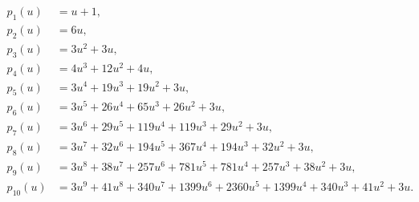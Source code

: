 \[
\begin{aligned}
p_1(u)&=u + 1,\\
p_2(u)&=6 u,\\
p_3(u)&=3 u^{2} + 3 u,\\
p_4(u)&=4 u^{3} + 12 u^{2} + 4 u,\\
p_5(u)&=3 u^{4} + 19 u^{3} + 19 u^{2} + 3 u,\\
p_6(u)&=3 u^{5} + 26 u^{4} + 65 u^{3} + 26 u^{2} + 3 u,\\
p_7(u)&=3 u^{6} + 29 u^{5} + 119 u^{4} + 119 u^{3} + 29 u^{2} + 3 u,\\
p_8(u)&=3 u^{7} + 32 u^{6} + 194 u^{5} + 367 u^{4} + 194 u^{3} + 32 u^{2} + 3 u,\\
p_9(u)&=3 u^{8} + 38 u^{7} + 257 u^{6} + 781 u^{5} + 781 u^{4} + 257 u^{3} + 38 u^{2} + 3 u,\\
p_10(u)&=3 u^{9} + 41 u^{8} + 340 u^{7} + 1399 u^{6} + 2360 u^{5} + 1399 u^{4} + 340 u^{3} + 41 u^{2} + 3 u.\\
\end{aligned}
\]
